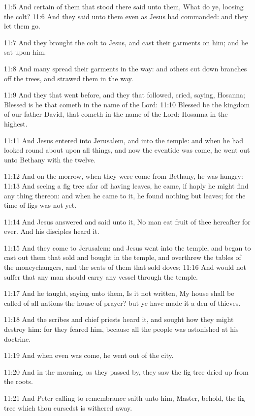 11:5 And certain of them that stood there said unto them, What do ye,
loosing the colt?  11:6 And they said unto them even as Jesus had
commanded: and they let them go.

11:7 And they brought the colt to Jesus, and cast their garments on
him; and he sat upon him.

11:8 And many spread their garments in the way: and others cut down
branches off the trees, and strawed them in the way.

11:9 And they that went before, and they that followed, cried, saying,
Hosanna; Blessed is he that cometh in the name of the Lord: 11:10
Blessed be the kingdom of our father David, that cometh in the name of
the Lord: Hosanna in the highest.

11:11 And Jesus entered into Jerusalem, and into the temple: and when
he had looked round about upon all things, and now the eventide was
come, he went out unto Bethany with the twelve.

11:12 And on the morrow, when they were come from Bethany, he was
hungry: 11:13 And seeing a fig tree afar off having leaves, he came,
if haply he might find any thing thereon: and when he came to it, he
found nothing but leaves; for the time of figs was not yet.

11:14 And Jesus answered and said unto it, No man eat fruit of thee
hereafter for ever. And his disciples heard it.

11:15 And they come to Jerusalem: and Jesus went into the temple, and
began to cast out them that sold and bought in the temple, and
overthrew the tables of the moneychangers, and the seats of them that
sold doves; 11:16 And would not suffer that any man should carry any
vessel through the temple.

11:17 And he taught, saying unto them, Is it not written, My house
shall be called of all nations the house of prayer? but ye have made
it a den of thieves.

11:18 And the scribes and chief priests heard it, and sought how they
might destroy him: for they feared him, because all the people was
astonished at his doctrine.

11:19 And when even was come, he went out of the city.

11:20 And in the morning, as they passed by, they saw the fig tree
dried up from the roots.

11:21 And Peter calling to remembrance saith unto him, Master, behold,
the fig tree which thou cursedst is withered away.

